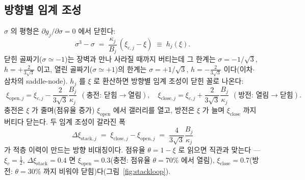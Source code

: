 \documentclass[11pt,a4paper]{article}
\begin{document}
\subsection{방향별 임계 조성}
$\sigma$ 의 평형은 $\partial g_j/\partial\sigma=0$ 에서 닫힌다:
\begin{equation}
\sigma^3-\sigma\;=\;\frac{\kappa_j}{B_j}\,(\xi_{c,j}-\xi)\;\equiv\;h_j(\xi).
\label{eq:sigmaeq}
\end{equation}
닫힌 골짜기($\sigma\simeq-1$)는 장벽과 만나 사라질 때까지 버티는데 그 한계는 $\sigma=-1/\sqrt3$,
$h=+\tfrac{2}{3\sqrt3}$ 이고, 열린 골짜기($\sigma\simeq+1$)의 한계는 $\sigma=+1/\sqrt3$,
$h=-\tfrac{2}{3\sqrt3}$ 이다(이차$\cdot$삼차의 saddle-node). $h_j$ 를 $\xi$ 로 환산하면 방향별 임계
조성이 닫힌 꼴로 나온다:
\begin{equation}
\boxed{\;
\xi_{\mathrm{open},j}=\xi_{c,j}-\frac{2}{3\sqrt3}\frac{B_j}{\kappa_j}
\ \ (\text{충전: 닫힘}\to\text{열림}),\quad
\xi_{\mathrm{close},j}=\xi_{c,j}+\frac{2}{3\sqrt3}\frac{B_j}{\kappa_j}
\ \ (\text{방전: 열림}\to\text{닫힘}).\;}
\label{eq:xistack}
\end{equation}
충전은 $\xi$ 가 줄며(점유율 증가) $\xi_{\mathrm{open}}$ 에서 갤러리를 열고, 방전은 $\xi$ 가 늘며
$\xi_{\mathrm{close}}$ 까지 버티다 닫는다. 두 임계 조성이 갈라진 폭
\begin{equation}
\Delta\xi_{\mathrm{stack},j}\;=\;\xi_{\mathrm{close},j}-\xi_{\mathrm{open},j}
\;=\;\frac{4}{3\sqrt3}\frac{B_j}{\kappa_j}
\label{eq:dxistack}
\end{equation}
가 적층 이력이 만드는 방향 비대칭이다. 점유율 $\theta=1-\xi$ 로 읽으면 직관과 맞는다 — $\xi_{c}=\tfrac12$,
$\Delta\xi_{\mathrm{stack}}=0.4$ 면 $\xi_{\mathrm{open}}=0.3$(충전: 점유율 $\theta=70\%$ 에서 열림),
$\xi_{\mathrm{close}}=0.7$(방전: $\theta=30\%$ 까지 비워야 닫힘)다(그림~\ref{fig:stackloop}).
\end{document}
